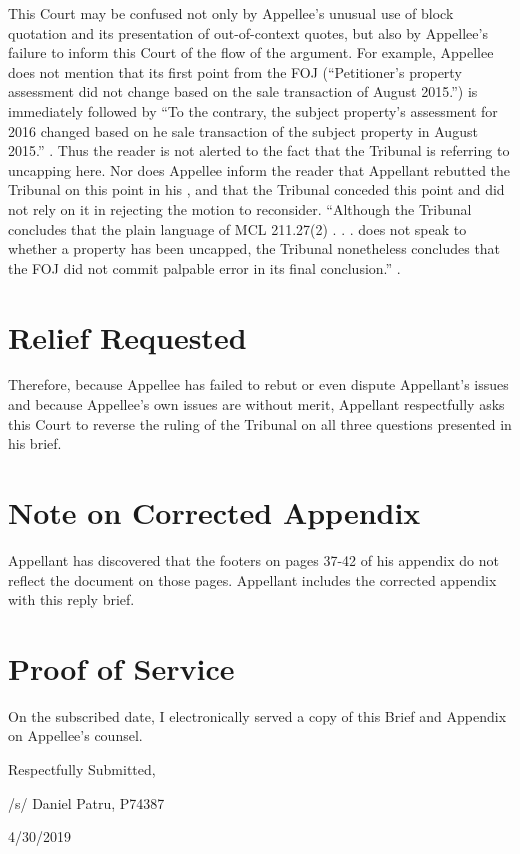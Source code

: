 \documentclass[12pt,\documentclassflag]{michiganCourtOfAppealsBrief}
\begin{document}
This Court may be confused not only by Appellee's unusual use of block quotation and its presentation of out-of-context quotes, but also by Appellee's failure to inform this Court of the flow of the argument. For example, Appellee does not mention that its first point from the FOJ (``Petitioner's property assessment did not change based on the sale transaction of August 2015.'') is immediately followed by ``To the contrary, the subject property's assessment for 2016 changed based on he sale transaction of the subject property in August 2015.'' \foj[5]. Thus the reader is not alerted to the fact that the Tribunal is referring to uncapping here. Nor does Appellee inform the reader that Appellant rebutted the Tribunal on this point in his \motionForReconsideration[4], and that the Tribunal conceded this point and did not rely on it in rejecting the motion to reconsider. ``Although the Tribunal concludes that the plain language of MCL 211.27(2) . . . does not speak to whether a property has been uncapped, the Tribunal nonetheless concludes that the FOJ did not commit palpable error in its final conclusion.'' \reconsiderationDenied[1-2].

\section{Relief Requested}

Therefore, because Appellee has failed to rebut or even dispute Appellant's issues and because Appellee's own issues are without merit, Appellant respectfully asks this Court to reverse the ruling of the Tribunal on all three questions presented in his brief.

\section{Note on Corrected Appendix}

Appellant has discovered that the footers on pages 37-42 of his appendix do not reflect the document on those pages. Appellant includes the corrected appendix with this reply brief.

\section{Proof of Service}

On the subscribed date, I electronically served a copy of this Brief and Appendix on Appellee's counsel.

\vspace{1\baselineskip}

{ \setlength{\leftskip}{3.5in}

  Respectfully Submitted,

  /s/ Daniel Patru, P74387

  4/30/2019

  \setlength{\leftskip}{0pt}}

\newpage\empty%
\end{document}
